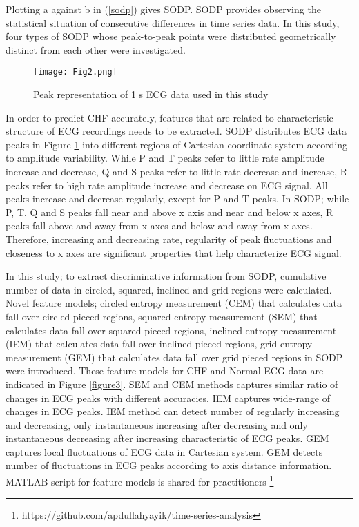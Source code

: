 \documentclass[twocolumn]{svjour3}
\begin{document}
Plotting a against b in (\ref{sodp}) gives SODP. SODP provides observing the statistical situation of consecutive differences in time series data. In this study, four types of SODP whose peak-to-peak points were distributed geometrically distinct from each other were investigated.

\begin{figure}
    \centering
    \texttt{[image: Fig2.png]}
    \caption{Peak representation of 1 s ECG data used in this study}
    \label{figure2}
\end{figure}


In order to predict CHF accurately, features that are related to characteristic structure of ECG recordings needs to be extracted. SODP distributes ECG data peaks in Figure \ref{figure2} into different regions of Cartesian coordinate system according to amplitude variability. While P and T peaks refer to little rate amplitude increase and decrease, Q and S peaks refer to little rate decrease and increase, R peaks refer to high rate amplitude increase and decrease on ECG signal. All peaks increase and decrease regularly, except for P and T peaks. In SODP; while P, T, Q and S peaks fall near and above x axis and near and below x axes, R peaks fall above and away from x axes and below and away from x axes. Therefore, increasing and decreasing rate, regularity of peak fluctuations and closeness to x axes are significant properties that help characterize ECG signal.

In this study; to extract discriminative information from SODP, cumulative number of data in circled, squared, inclined and grid regions were calculated. Novel feature models; circled entropy measurement (CEM) that calculates data fall over circled pieced regions,  squared entropy measurement (SEM) that calculates data fall over squared pieced regions, inclined entropy measurement (IEM) that calculates data fall over inclined pieced regions, grid entropy measurement (GEM) that calculates data fall over grid pieced regions in SODP were introduced. These feature models for CHF and Normal ECG data are indicated in Figure \ref{figure3}. SEM and CEM methods captures similar ratio of changes in ECG peaks with different accuracies. IEM captures wide-range of changes in ECG peaks. IEM method can detect number of regularly increasing and decreasing, only instantaneous increasing after decreasing and only instantaneous decreasing after increasing characteristic of ECG peaks. GEM captures local fluctuations of ECG data in Cartesian system. GEM detects number of fluctuations in ECG peaks according to axis distance information. MATLAB script for feature models is shared for practitioners \footnote{https://github.com/apdullahyayik/time-series-analysis}
\end{document}
